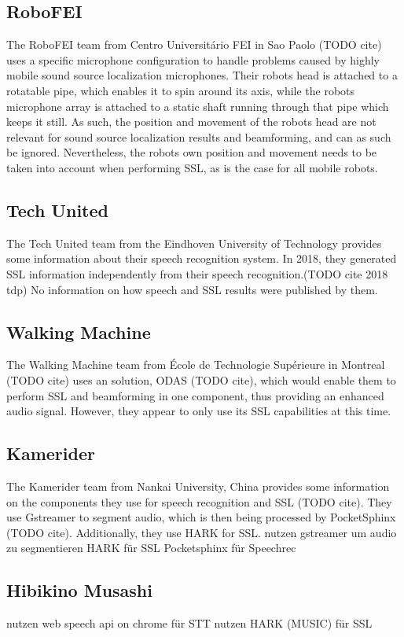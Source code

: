 \subsection{RoboFEI}
The RoboFEI team from Centro Universitário FEI in Sao Paolo (TODO cite) uses a specific microphone configuration to handle problems caused by highly mobile sound source localization microphones.
Their robots head is attached to a rotatable pipe, which enables it to spin around its axis, while the robots microphone array is attached to a static shaft running through that pipe which keeps it still.
As such, the position and movement of the robots head are not relevant for sound source localization results and beamforming, and can as such be ignored.
Nevertheless, the robots own position and movement needs to be taken into account when performing SSL, as is the case for all mobile robots.

\subsection{Tech United}
The Tech United team from the Eindhoven University of Technology provides some information about their speech recognition system.
In 2018, they generated SSL information independently from their speech recognition.(TODO cite 2018 tdp)
No information on how speech and SSL results were published by them.

\subsection{Walking Machine}
The Walking Machine team from École de Technologie Supérieure in Montreal (TODO cite) uses an solution, ODAS (TODO cite), which would enable them to perform SSL and beamforming in one component, thus providing an enhanced audio signal.
However, they appear to only use its SSL capabilities at this time.


\subsection{Kamerider}
The Kamerider team from Nankai University, China provides some information on the components they use for speech recognition and SSL (TODO cite).
They use Gstreamer to segment audio, which is then being processed by PocketSphinx (TODO cite).
Additionally, they use HARK for SSL.
nutzen gstreamer um audio zu segmentieren %
HARK für SSL
Pocketsphinx für Speechrec


\subsection{Hibikino Musashi}
nutzen web speech api on chrome für STT
nutzen HARK (MUSIC) für SSL
